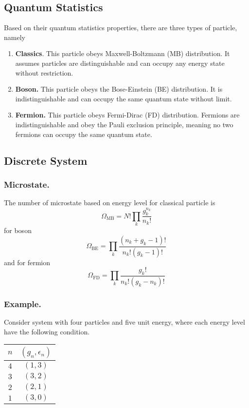\documentclass[../../../Main.tex]{subfiles}
\begin{document}
\subsection{Quantum Statistics}
Based on their quantum statistics properties, there are three types of particle, namely 
\begin{enumerate}
    \item \textbf{Classics}. This particle obeys Maxwell-Boltzmann (MB) distribution. It assumes particles are distinguishable and can occupy any energy state without restriction.
    \item \textbf{Boson.} This particle obeys the Bose-Einstein (BE) distribution. It is indistinguishable and can occupy the same quantum state without limit.
    \item \textbf{Fermion.} This particle obeys Fermi-Dirac (FD) distribution. Fermions are indistinguishable and obey the Pauli exclusion principle, meaning no two fermions can occupy the same quantum state.
\end{enumerate}

\subsection{Discrete System}
\subsubsection{Microstate.} The number of microstate based on energy level for classical particle is 
\begin{equation*}
    \Omega_\text{MB}=N!\prod_k \frac{g_k^{n_k}}{n_k!}
\end{equation*}
for boson 
\begin{equation*}
    \Omega_\text{BE}=\prod_k\frac{(n_k+g_k-1)!}{n_k!(g_k-1)!}
\end{equation*}
and for fermion
\begin{equation*}
    \Omega_\text{FD}=\prod_k\frac{g_k!}{n_k!(g_k-n_k)!}
\end{equation*}

\subsubsection{Example.} Consider system with four particles and five unit energy, where each energy level have the following condition.
\begin{table}[h]
    \centering
    \begin{tabular}{cc}
    \toprule
    $n$ & $(g_n,\epsilon_n)$\\ 
    \midrule
    $4$&$(1,3)$\\
    $3$&$(3,2)$\\
    $2$&$(2,1)$\\
    $1$&$(3,0)$\\
    \bottomrule
    \end{tabular}
\end{table}
    
\end{document}
